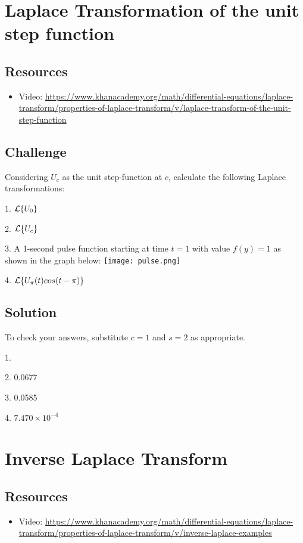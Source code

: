 \newpage
\section{Laplace Transformation of the unit step function}

\subsection*{Resources}
\begin{itemize}
    \item Video: \url{https://www.khanacademy.org/math/differential-equations/laplace-transform/properties-of-laplace-transform/v/laplace-transform-of-the-unit-step-function} %
\end{itemize}

\subsection*{Challenge}
Considering $U_c$ as the unit step-function at $c$, calculate the following Laplace transformations:

1. $\displaystyle \mathcal{L}\{U_0\}$

2. $\displaystyle \mathcal{L}\{U_c\}$

3. A 1-second pulse function starting at time $t=1$ with value $f(y)=1$ as shown in the graph below:
\texttt{[image: pulse.png]}

4. $\displaystyle \mathcal{L}\{U_\pi(t) cos(t-\pi)\}$

\subsection*{Solution}
To check your answers, substitute $c=1$ and $s=2$ as appropriate.

1. 

2. 0.0677

3. 0.0585

4. $7.470 \times 10^{-4}$




\newpage
\section{Inverse Laplace Transform}

\subsection*{Resources}
\begin{itemize}
    \item Video: \url{https://www.khanacademy.org/math/differential-equations/laplace-transform/properties-of-laplace-transform/v/inverse-laplace-examples} %
\end{itemize}

